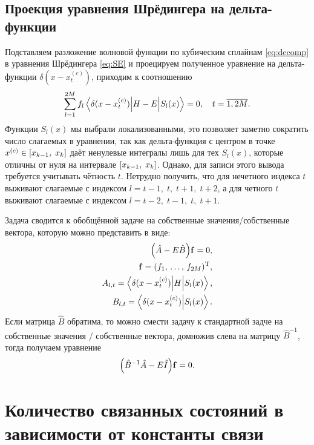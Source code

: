 \documentclass[10pt]{article}
\begin{document}
\subsection{Проекция уравнения Шрёдингера на дельта-функции}

Подставляем разложение волновой функции по кубическим сплайнам \eqref{eq:decomp} в уравнения Шрёдингера \eqref{eq:SE} и проецируем полученное уравнение на дельта-функции $\delta(x-x^{(c)}_t)$, приходим к соотношению
\begin{equation}
    \sum\limits_{l=1}^{2M} f_{l}
    \mel**{\delta(x-x^{(c)}_t)}{H-E}{S_{l}(x)}=0,\quad t=\overline{1,2M}.
\end{equation}
Функции $S_l(x)$ мы выбрали локализованными, это позволяет заметно сократить число слагаемых в уравнении, так как дельта-функция с центром в точке $x^{(c)}\in\qty[x_{k-1},\;x_{k}]$ даёт ненулевые интегралы лишь для тех $S_l(x)$, которые отличны от нуля на интервале $\qty[x_{k-1},\;x_{k}]$. Однако, для записи этого вывода требуется учитывать чётность $t$. Нетрудно получить, что для нечетного индекса $t$ выживают слагаемые с индексом $l=t-1,\;t,\;t+1,\;t+2$, а для четного $t$ выживают слагаемые с индексом $l=t-2,\;t-1,\;t,\;t+1$.

Задача сводится к обобщённой задаче на собственные значения/собственные вектора, которую можно представить в виде:
\begin{equation}
 \begin{split}
  \qty(\hat A - E \hat B) \vb{f} = 0,\\
  \vb{f} = (f_1,\, \ldots,\, f_{2M})^\textrm{T},\\
  A_{l,t} = \mel**{\delta(x-x^{(c)}_t)}{H}{S_{l}(x)},\\
  B_{l,t} = \braket{\delta(x-x^{(c)}_t)}{S_{l}(x)}.
 \end{split}
\end{equation}
Если матрица $\hat B$ обратима, то можно смести задачу к стандартной задче на собственные значения / собственные вектора, домножив слева на матрицу  $\hat B^{-1}$, тогда получаем уравнение
\begin{equation}
 \qty(\hat B^{-1} \hat A - E \hat I) \vb{f} = 0.
\end{equation}

\section{Количество связанных состояний в зависимости от константы связи}
\end{document}
